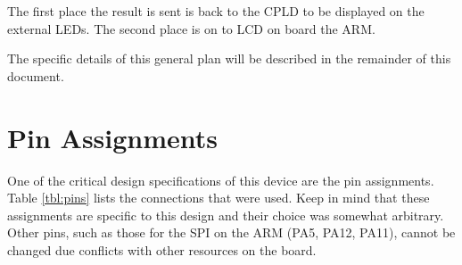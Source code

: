\documentclass{article}
\begin{document}
The first place the result is sent is back to the CPLD to be
displayed on the external LEDs.
The second place is on to LCD on board the ARM.

The specific details of this general plan will be described 
in the remainder of this document.



\section{Pin Assignments}
\label{sec:pa}

One of the critical design specifications of this device are
the pin assignments.
Table \ref{tbl:pins} lists the connections that were used.
Keep in mind that these assignments are specific to this
design and their choice was somewhat arbitrary.
Other pins, such as those for the SPI on the ARM (PA5, PA12, PA11),
cannot be changed due conflicts with other resources on the board.
\end{document}

